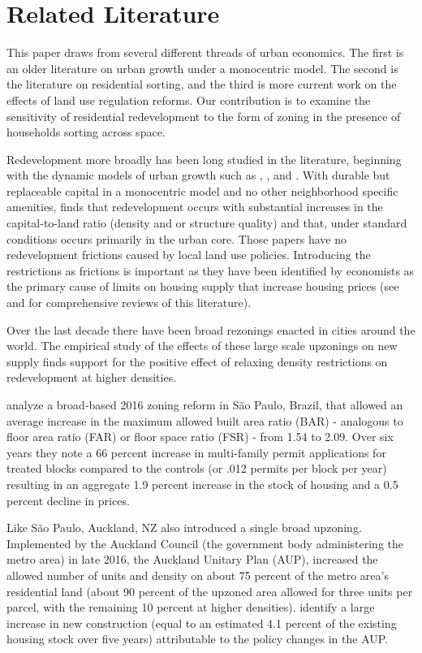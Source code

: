 \documentclass[12pt]{article}
\begin{document}
\section{\label{sec:lit}Related Literature}

This paper draws from several different threads of urban economics. The first is an older literature on urban growth under a monocentric model. The second is the literature on residential sorting, and the third is more current work on the effects of land use regulation reforms. Our contribution is to  examine the sensitivity of residential redevelopment to the form of zoning in the presence of households sorting across space. 

Redevelopment more broadly has been long studied in the literature, beginning with the dynamic models of urban growth such as \textcite{Brueckner_1981}, \textcite{HochmanPines_1980}, and \textcite{Wheaton_1982}. With durable but replaceable capital in a monocentric model and no other neighborhood specific amenities, \textcite{Wheaton_1982} finds that redevelopment occurs with substantial increases in the capital-to-land ratio (density and or structure quality) and that, under standard conditions occurs primarily in the urban core. Those papers have no redevelopment frictions caused by local land use policies. Introducing the restrictions as frictions is important as they have been identified by economists as the primary cause of limits on housing supply that increase housing prices (see \textcite{GyourkoMolloy2015} and \textcite{Molloy2020} for comprehensive reviews of this literature).

Over the last decade there have been broad rezonings enacted in cities around the world. The empirical study of the effects of these large scale upzonings on new supply finds support for the positive effect of relaxing density restrictions on redevelopment at higher densities. 

\textcite{Anagol_etal2021} analyze a broad-based 2016 zoning reform in S\~{a}o Paulo, Brazil, that allowed an average increase in the maximum allowed built area ratio (BAR) - analogous to floor area ratio (FAR) or floor space ratio (FSR) - from 1.54 to 2.09. Over six years they note a 66 percent increase in multi-family permit applications for treated blocks compared to the controls (or .012 permits per block per year) resulting in an aggregate 1.9 percent increase in the stock of housing and a 0.5 percent decline in prices.

Like S\~{a}o Paulo, Auckland, NZ also introduced a single broad upzoning. Implemented by the Auckland Council (the government body administering the metro area) in late 2016, the Auckland Unitary Plan (AUP), increased the allowed number of units and density on about 75 percent of the metro area's residential land (about 90 percent of the upzoned area allowed for three units per parcel, with the remaining 10 percent at higher densities). \textcite{GreenawayPhillips2023} identify a large increase in new construction (equal to an estimated 4.1 percent of the existing housing stock over five years) attributable to the policy changes in the AUP. 
\end{document}
